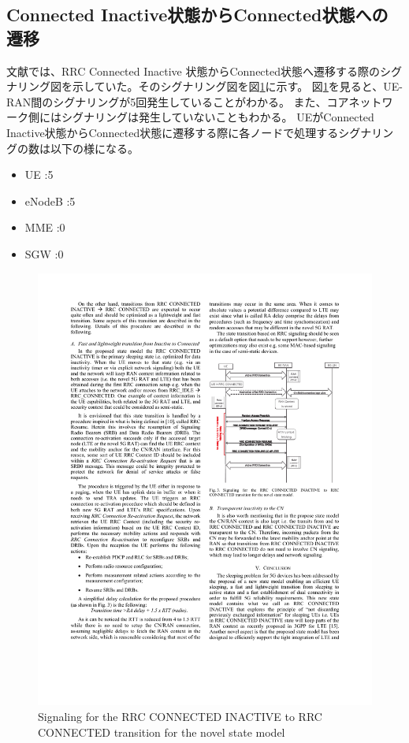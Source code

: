 \documentclass[a4j]{ujarticle}
\begin{document}
\subsection{Connected Inactive状態からConnected状態への遷移}
\label{sec:cennectedinactive-connected}
文献\cite{ANovelStateModelfor5GRadioAccessNetworks}では、RRC Connected Inactive 状態からConnected状態へ遷移する際のシグナリング図を示していた。そのシグナリング図を図\ref{Signaling_for_the_RRC_CONNECTED_INACTIVE_to_RRC_CONNECTED_transition_for_the_novel_state_model}に示す。
図\ref{Signaling_for_the_RRC_CONNECTED_INACTIVE_to_RRC_CONNECTED_transition_for_the_novel_state_model}を見ると、UE-RAN間のシグナリングが5回発生していることがわかる。
また、コアネットワーク側にはシグナリングは発生していないこともわかる。
UEがConnected Inactive状態からConnected状態に遷移する際に各ノードで処理するシグナリングの数は以下の様になる。
\begin{itemize}
  \item UE      :5
  \item eNodeB  :5
  \item MME     :0
  \item SGW     :0
\end{itemize}\begin{figure}[htbp]
  \centering
  \includegraphics[width=0.9\hsize]{Signaling_for_the_RRC_CONNECTED_INACTIVE_to_RRC_CONNECTED_transition_for_the_novel_state_model.pdf}
  \caption{Signaling for the RRC CONNECTED INACTIVE to RRC CONNECTED transition for the novel state model}
  \label{Signaling_for_the_RRC_CONNECTED_INACTIVE_to_RRC_CONNECTED_transition_for_the_novel_state_model}
\end{figure}
\clearpage
\end{document}
